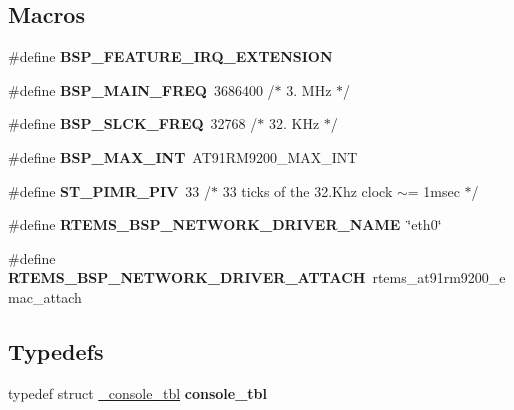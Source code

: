 \subsection*{Macros}
\begin{DoxyCompactItemize}
\item 
\mbox{\label{group__RTEMSBSPsARMCSB337_ga5d7d631d3a14b7554160f14eb42f351b}} 
\#define {\bfseries B\+S\+P\+\_\+\+F\+E\+A\+T\+U\+R\+E\+\_\+\+I\+R\+Q\+\_\+\+E\+X\+T\+E\+N\+S\+I\+ON}
\item 
\mbox{\label{group__RTEMSBSPsARMCSB337_ga75e8d9125e928c238804d0cc9b520ebd}} 
\#define {\bfseries B\+S\+P\+\_\+\+M\+A\+I\+N\+\_\+\+F\+R\+EQ}~3686400      /$\ast$ 3. M\+Hz $\ast$/
\item 
\mbox{\label{group__RTEMSBSPsARMCSB337_gaad38bfd30fcb4bf2ebc8ec85444281a3}} 
\#define {\bfseries B\+S\+P\+\_\+\+S\+L\+C\+K\+\_\+\+F\+R\+EQ}~32768      /$\ast$ 32. K\+Hz $\ast$/
\item 
\mbox{\label{group__RTEMSBSPsARMCSB337_ga33750fa8211ef2e4abe8d852443af594}} 
\#define {\bfseries B\+S\+P\+\_\+\+M\+A\+X\+\_\+\+I\+NT}~A\+T91\+R\+M9200\+\_\+\+M\+A\+X\+\_\+\+I\+NT
\item 
\mbox{\label{group__RTEMSBSPsARMCSB337_ga027bc0f99eac8932ed52742be6dd443d}} 
\#define {\bfseries S\+T\+\_\+\+P\+I\+M\+R\+\_\+\+P\+IV}~33	/$\ast$ 33 ticks of the 32.\+Khz clock $\sim$= 1msec $\ast$/
\item 
\mbox{\label{group__RTEMSBSPsARMCSB337_ga86d4f9aa98431100692e31068070a8df}} 
\#define {\bfseries R\+T\+E\+M\+S\+\_\+\+B\+S\+P\+\_\+\+N\+E\+T\+W\+O\+R\+K\+\_\+\+D\+R\+I\+V\+E\+R\+\_\+\+N\+A\+ME}~\char`\"{}eth0\char`\"{}
\item 
\mbox{\label{group__RTEMSBSPsARMCSB337_gadde0d66aef9442971dde465292ac14e6}} 
\#define {\bfseries R\+T\+E\+M\+S\+\_\+\+B\+S\+P\+\_\+\+N\+E\+T\+W\+O\+R\+K\+\_\+\+D\+R\+I\+V\+E\+R\+\_\+\+A\+T\+T\+A\+CH}~rtems\+\_\+at91rm9200\+\_\+emac\+\_\+attach
\end{DoxyCompactItemize}
\subsection*{Typedefs}
\begin{DoxyCompactItemize}
\item 
\mbox{\label{group__RTEMSBSPsARMCSB337_ga87620480bc3e67dcf5efb1ca3e6819da}} 
typedef struct \mbox{\hyperlink{struct__console__tbl}{\+\_\+console\+\_\+tbl}} {\bfseries console\+\_\+tbl}
\end{DoxyCompactItemize}
